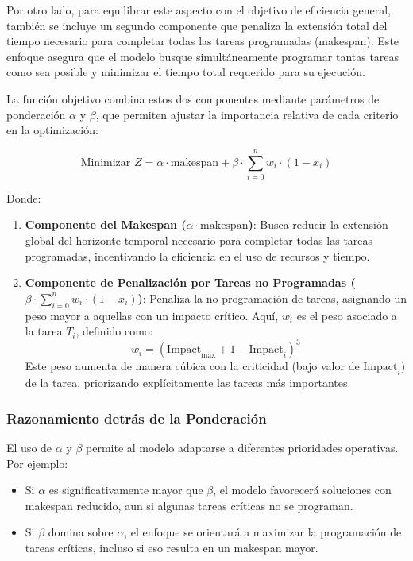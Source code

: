 \documentclass{article}
\begin{document}
Por otro lado, para equilibrar este aspecto con el objetivo de eficiencia general, también se incluye un segundo componente que penaliza la extensión total del tiempo necesario para completar todas las tareas programadas (makespan). Este enfoque asegura que el modelo busque simultáneamente programar tantas tareas como sea posible y minimizar el tiempo total requerido para su ejecución.

La función objetivo combina estos dos componentes mediante parámetros de ponderación \( \alpha \) y \( \beta \), que permiten ajustar la importancia relativa de cada criterio en la optimización:

\[
\text{Minimizar } Z = \alpha \cdot \text{makespan} + \beta \cdot \sum_{i=0}^{n} w_i \cdot (1 - x_i)
\]

Donde:

\begin{enumerate}
    \item \textbf{Componente del Makespan (\( \alpha \cdot \text{makespan} \))}: Busca reducir la extensión global del horizonte temporal necesario para completar todas las tareas programadas, incentivando la eficiencia en el uso de recursos y tiempo.

    \item \textbf{Componente de Penalización por Tareas no Programadas (\( \beta \cdot \sum_{i=0}^{n} w_i \cdot (1 - x_i) \))}: Penaliza la no programación de tareas, asignando un peso mayor a aquellas con un impacto crítico. Aquí, \( w_i \) es el peso asociado a la tarea \( T_i \), definido como:
    \[
    w_i = (\text{Impact}_{\text{max}} + 1 - \text{Impact}_i)^3
    \]
    Este peso aumenta de manera cúbica con la criticidad (bajo valor de \( \text{Impact}_i \)) de la tarea, priorizando explícitamente las tareas más importantes.
\end{enumerate}

\subsubsection*{Razonamiento detrás de la Ponderación}

El uso de \( \alpha \) y \( \beta \) permite al modelo adaptarse a diferentes prioridades operativas. Por ejemplo:

\begin{itemize}
    \item Si \( \alpha \) es significativamente mayor que \( \beta \), el modelo favorecerá soluciones con makespan reducido, aun si algunas tareas críticas no se programan.
    \item Si \( \beta \) domina sobre \( \alpha \), el enfoque se orientará a maximizar la programación de tareas críticas, incluso si eso resulta en un makespan mayor.
\end{itemize}
\end{document}
